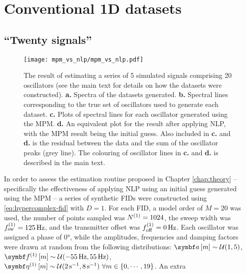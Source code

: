 \section{Conventional \ac{1D} datasets}
\label{sec:evaluation}

\subsection{``Twenty signals''}
\begin{sidewaysfigure}
    \centering
    \texttt{[image: mpm\_vs\_nlp/mpm\_vs\_nlp.pdf]}
    \caption[
        The result of estimating a series of 5 simulated signals comprising 20
        oscillators, using solely the \acs{MPM} and also with phase
        variance-regularised \acs{NLP} afterwards.
    ]{
        The result of estimating a series of 5 simulated signals comprising 20
        oscillators (see the main text for details on how the datasets were constructed).
        \textbf{a.} Spectra of the datasets generated.
        \textbf{b.} Spectral lines corresponding to the true set of oscillators
        used to generate each dataset.
        \textbf{c.} Plots of spectral lines for each oscillator generated using
        the \acs{MPM}.
        \textbf{d.} An equivalent plot for the result after applying \acs{NLP},
        with the \acs{MPM} result being the initial guess.
        Also included in \textbf{c.} and \textbf{d.} is the residual between the
        data and the sum of the oscillator peaks (grey line).
        The colouring of oscillator lines in \textbf{c.} and \textbf{d.} is
        described in the main text.
    }
    \label{fig:mpm_vs_nlp}
\end{sidewaysfigure}
In order to assess the estimation routine proposed in Chapter \ref{chap:theory}
-- specifically the effectiveness of applying \ac{NLP} using an initial guess
generated using the \ac{MPM} -- a series of synthetic \acp{FID} were constructed
using \eqref{eq:hypercomplex-fid} with $D=1$. For each \ac{FID}, a model order
of $M=20$ was used, the number of points sampled was $N^{(1)} = 1024$, the sweep
width was $f_{\mathrm{sw}}^{(1)}=\qty{125}{\hertz}$, and the transmitter offset was $f_{\mathrm{off}}^{(1)}
= \qty{0}{\hertz}$.  Each oscillator was assigned a phase of \ang{0}, while the
amplitudes, frequencies and damping factors were drawn at random from the
following distributions:
$\bdam \sim \mathcal{U}(1, 5)$, $\bdfonem \sim \mathcal{U}(\qty{-55}{\hertz},
\qty{55}{\hertz})$, $\bdetaonem \sim \mathcal{U}(\qty{2}{\per\second},
\qty{8}{\per\second})\ \forall m \in \lbrace 0, \cdots, 19\rbrace$. An extra
